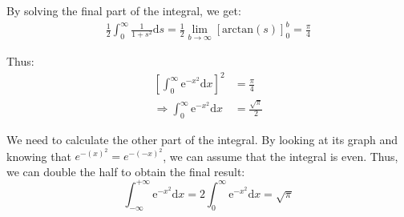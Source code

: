 \documentclass[11pt]{article}
\begin{document}
By solving the final part of the integral, we get:
\begin{equation}
\begin{split}
\frac{1}{2}\int_{0}^{\infty}\frac{1}{1+s^2}\mathrm ds
=\frac{1}{2}\lim_{b\rightarrow \infty}\left [\text{arctan}\left (s\right ) \right ]_{0}^{b}
=\frac{\pi}{4}
\end{split}
\end{equation}

Thus:
\begin{equation}
\begin{split}
\left [\int_{0}^{\infty}\mathrm e^{-x^2}\mathrm dx\right ]^2&=\frac{\pi}{4}\\
\Rightarrow\int_{0}^{\infty}\mathrm e^{-x^2}\mathrm dx      &=\frac{\sqrt{\pi}}{2}
\end{split}
\end{equation}

We need to calculate the other part of the integral. By looking at its graph and knowing that $e^{-(x)^2}=e^{-(-x)^2}$, we can assume that the integral is even. Thus, we can double the half to obtain the final result:
\begin{equation}
\int_{-\infty}^{+\infty}\mathrm e^{-x^2}\mathrm dx
=2\int_{0}^{\infty}\mathrm e^{-x^2}\mathrm dx
=\sqrt{\pi}
\end{equation}
\end{document}
